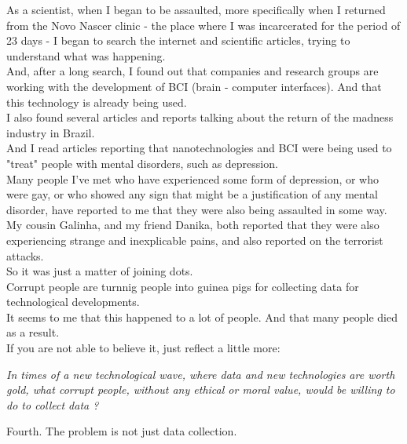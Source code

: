 \documentclass[11pt]{book}
\begin{document}
\noindent As a scientist, when I began to be assaulted, more specifically when I returned from the Novo Nascer clinic - the place where I was incarcerated for the period of 23 days - I began to search the internet and scientific articles, trying to understand what was happening. \\

\noindent And, after a long search, I found out that companies and research groups are working with the development of BCI (brain - computer interfaces). And that this technology is already being used. \\

\noindent I also found several articles and reports talking about the return of the madness industry in Brazil. \\

\noindent And I read articles reporting that nanotechnologies and BCI were being used to "treat" people with mental disorders, such as depression. \\

\noindent Many people I've met who have experienced some form of depression, or who were gay, or who showed any sign that might be a justification of any mental disorder, have reported to me that they were also being assaulted in some way. My cousin Galinha, and my friend Danika, both reported that they were also experiencing strange and inexplicable pains, and also reported on the terrorist attacks. \\

\noindent So it was just a matter of joining dots. \\

\noindent Corrupt people are turnnig people into guinea pigs for collecting data for technological developments. \\

\noindent It seems to me that this happened to a lot of people. And that many people died as a result. \\

\noindent If you are not able to believe it, just reflect a little more:

\noindent \begin{center} \emph{In times of a new technological wave, where data and new technologies are worth gold, what corrupt people, without any ethical or moral value, would be willing to do to collect data ?} \end{center}

\noindent Fourth. The problem is not just data collection. \\
\end{document}
